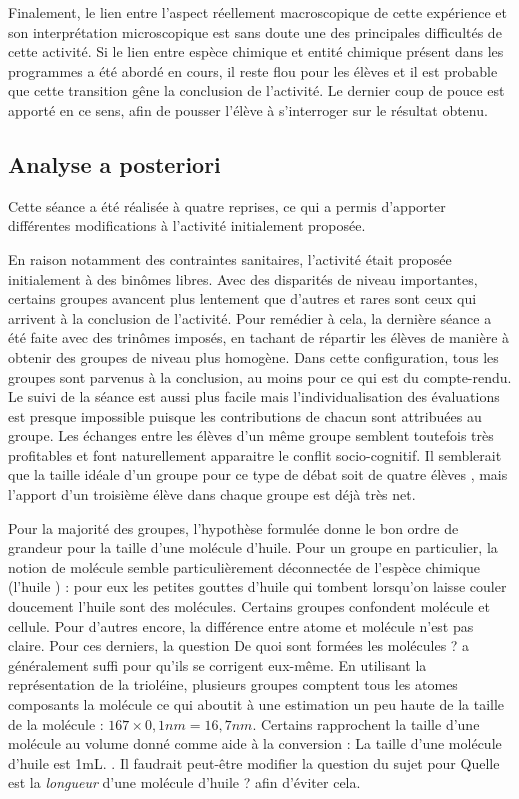 \documentclass[12pt,a4paper]{article}
\begin{document}
Finalement, le lien entre l'aspect réellement macroscopique de cette expérience et son interprétation microscopique est sans doute une des principales difficultés de cette activité.
Si le lien entre espèce chimique et entité chimique présent dans les programmes a été abordé en cours, il reste flou pour les élèves et il est probable que cette transition gêne la conclusion de l'activité.
Le dernier coup de pouce est apporté en ce sens, afin de pousser l'élève à s'interroger sur le résultat obtenu.

\subsection{Analyse a posteriori}

Cette séance a été réalisée à quatre reprises, ce qui a permis d'apporter différentes modifications à l'activité initialement proposée.

En raison notamment des contraintes sanitaires, l'activité était proposée initialement à des binômes libres.
Avec des disparités de niveau importantes, certains groupes avancent plus lentement que d'autres et rares sont ceux qui arrivent à la conclusion de l'activité.
Pour remédier à cela, la dernière séance a été faite avec des trinômes imposés, en tachant de répartir les élèves de manière à obtenir des groupes de niveau plus homogène.
Dans cette configuration, tous les groupes sont parvenus à la conclusion, au moins pour ce qui est du compte-rendu.
Le suivi de la séance est aussi plus facile mais l'individualisation des évaluations est presque impossible puisque les contributions de chacun sont attribuées au groupe.
Les échanges entre les élèves d'un même groupe semblent toutefois très profitables et font naturellement apparaitre le conflit socio-cognitif.
Il semblerait que la taille idéale d'un groupe pour ce type de débat soit de quatre élèves \cite{Courtillot2006}, mais l'apport d'un troisième élève dans chaque groupe est déjà très net.

Pour la majorité des groupes, l'hypothèse formulée donne le bon ordre de grandeur pour la taille d'une molécule d'huile.
Pour un groupe en particulier, la notion de molécule semble particulièrement déconnectée de l'espèce chimique (\og l'huile \fg{}) : pour eux les petites gouttes d'huile qui tombent lorsqu'on laisse couler doucement l'huile sont des molécules.
Certains groupes confondent molécule et cellule.
Pour d'autres encore, la différence entre atome et molécule n'est pas claire.
Pour ces derniers, la question \og De quoi sont formées les molécules ? \fg{} a généralement suffi pour qu'ils se corrigent eux-même.
En utilisant la représentation de la trioléine, plusieurs groupes comptent tous les atomes composants la molécule ce qui aboutit à une estimation un peu haute de la taille de la molécule : $167 \times \unit{0{,}1}{nm}=\unit{16{,}7}{nm}$.
Certains rapprochent la taille d'une molécule au volume donné comme aide à la conversion : \og La taille d'une molécule d'huile est \unit{1}{mL}. \fg{}.
Il faudrait peut-être modifier la question du sujet pour \og Quelle est la \emph{longueur} d'une molécule d'huile ? \fg{} afin d'éviter cela. 
\end{document}
